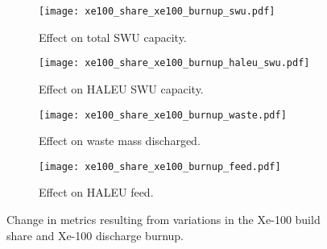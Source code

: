 \begin{figure}    
    \begin{subfigure}[b]{0.48\textwidth}
        \centering
        \texttt{[image: xe100\_share\_xe100\_burnup\_swu.pdf]}
        \caption{Effect on total SWU capacity.}
        \label{fig:xe100_share_xe100_burnup_swu}
    \end{subfigure}
    \hfill
    \begin{subfigure}[b]{0.48\textwidth}
        \centering
        \texttt{[image: xe100\_share\_xe100\_burnup\_haleu\_swu.pdf]}
        \caption{Effect on HALEU SWU capacity.}
        \label{fig:xe100_share_xe100_burnup_haleu_swu}
    \end{subfigure}
    
    \begin{subfigure}[b]{0.48\textwidth}
        \centering
        \texttt{[image: xe100\_share\_xe100\_burnup\_waste.pdf]}
        \caption{Effect on waste mass discharged.}
        \label{fig:xe100_share_xe100_burnup_waste}
    \end{subfigure}
    \hfill
    \begin{subfigure}[b]{0.48\textwidth}
        \centering
        \texttt{[image: xe100\_share\_xe100\_burnup\_feed.pdf]}
        \caption{Effect on HALEU feed.}
        \label{fig:xe100_share_xe100_burnup_feed}
    \end{subfigure}
    \caption{Change in metrics resulting from variations in the 
    Xe-100 build share and Xe-100 discharge burnup.}
    \label{fig:xe100_share_xe100_burnup}
\end{figure}

